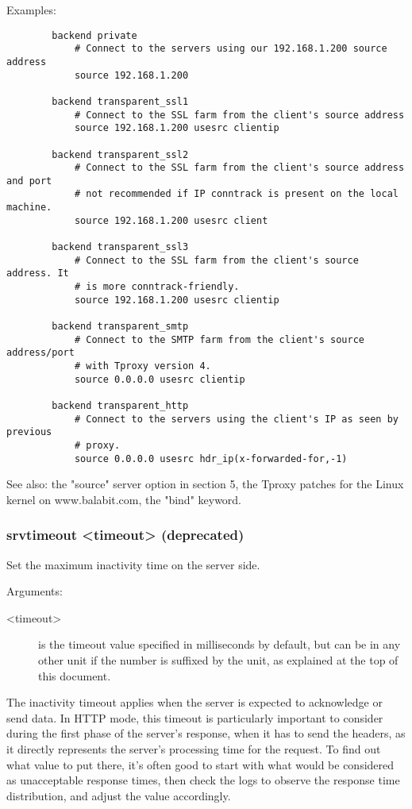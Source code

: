   Examples:
  \begin{verbatim}
        backend private
            # Connect to the servers using our 192.168.1.200 source address
            source 192.168.1.200

        backend transparent_ssl1
            # Connect to the SSL farm from the client's source address
            source 192.168.1.200 usesrc clientip

        backend transparent_ssl2
            # Connect to the SSL farm from the client's source address and port
            # not recommended if IP conntrack is present on the local machine.
            source 192.168.1.200 usesrc client

        backend transparent_ssl3
            # Connect to the SSL farm from the client's source address. It
            # is more conntrack-friendly.
            source 192.168.1.200 usesrc clientip

        backend transparent_smtp
            # Connect to the SMTP farm from the client's source address/port
            # with Tproxy version 4.
            source 0.0.0.0 usesrc clientip

        backend transparent_http
            # Connect to the servers using the client's IP as seen by previous
            # proxy.
            source 0.0.0.0 usesrc hdr_ip(x-forwarded-for,-1)
  \end{verbatim}

  See also: the "source" server option in section 5, the Tproxy patches for
             the Linux kernel on www.balabit.com, the "bind" keyword.

\subsubsection[srvtimeout]{srvtimeout <timeout> (deprecated)}


  Set the maximum inactivity time on the server side.


  Arguments:
  \begin{description}
  \item[<timeout>] is the timeout value specified in milliseconds by default, but
              can be in any other unit if the number is suffixed by the unit,
              as explained at the top of this document.
  \end{description}

  The inactivity timeout applies when the server is expected to acknowledge or
  send data. In HTTP mode, this timeout is particularly important to consider
  during the first phase of the server's response, when it has to send the
  headers, as it directly represents the server's processing time for the
  request. To find out what value to put there, it's often good to start with
  what would be considered as unacceptable response times, then check the logs
  to observe the response time distribution, and adjust the value accordingly.

